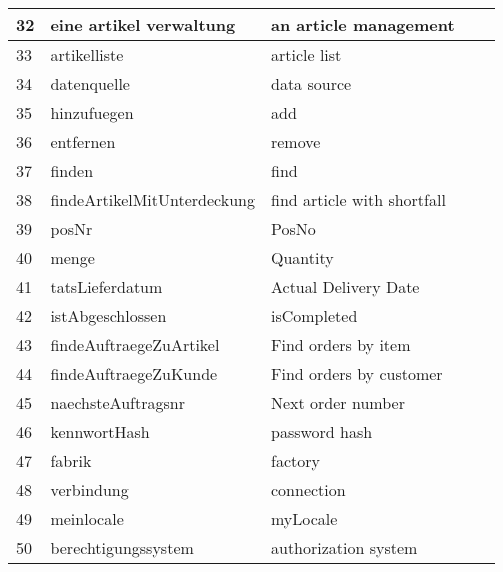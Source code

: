 \begin{table}[h]
\begin{tabular}{|p{0.5cm}|p{8cm}|l|l|p{3cm}|}
32 & eine artikel verwaltung & an article management\\ \hline
33 & artikelliste & article list\\ \hline
34 & datenquelle & data source\\ \hline
35 & hinzufuegen & add\\ \hline
36 & entfernen & remove\\ \hline
37 & finden & find\\ \hline
38 & findeArtikelMitUnterdeckung & find article with shortfall\\ \hline
39 & posNr & PosNo\\ \hline
40 & menge & Quantity\\ \hline
41 & tatsLieferdatum & Actual Delivery Date\\ \hline
42 & istAbgeschlossen & isCompleted\\ \hline
43 & findeAuftraegeZuArtikel & Find orders by item\\ \hline
44 & findeAuftraegeZuKunde & Find orders by customer\\ \hline
45 & naechsteAuftragsnr & Next order number\\ \hline
46 & kennwortHash & password hash\\ \hline
47 & fabrik & factory\\ \hline
48 & verbindung & connection\\ \hline
49 & meinlocale & myLocale\\ \hline
50 & berechtigungssystem & authorization system\\ \hline
\end{tabular}
\end{table}
